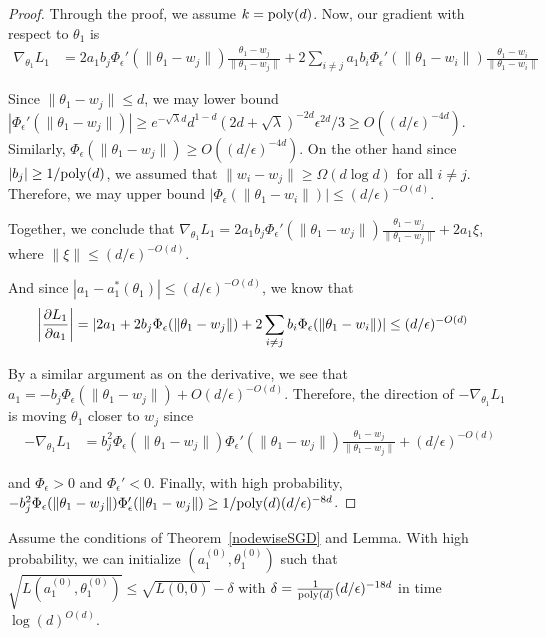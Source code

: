\begin{proof}
Through the proof, we assume $k = \mathrm{poly}(d)$. Now, our gradient with respect to $\theta_1$ is
%
\begin{align*}
\nabla_{\theta_1} L_1 &= 2a_1b_j \Phi_\epsilon'(\|\theta_1 - w_j\|) \frac{\theta_1 - w_j}{\|\theta_1 - w_j\|}+ 2\sum_{i\neq j} a_1b_i\Phi_\epsilon'(\|\theta_1 - w_i\|) \frac{\theta_1 - w_i}{\|\theta_1 - w_i\|}
\end{align*}
%

Since $\|\theta_1 - w_j\| \leq d$, we may lower bound $|\Phi_\epsilon'(\|\theta_1 - w_j\|)| \geq e^{-\sqrt{\lambda}d}d^{1-d}(2d+\sqrt{\lambda})^{-2d}\epsilon^{2d}/3 \geq O((d/\epsilon)^{-4d})$. Similarly, $\Phi_\epsilon(\|\theta_1 - w_j\|) \geq O((d/\epsilon)^{-4d})$. On the other hand since $|b_j| \geq 1/\mathrm{poly}(d)$, we assumed that $\|w_i - w_j\| \geq \Omega(d \log d)$ for all $i \neq j$. Therefore, we may upper bound $|\Phi_{\epsilon}(\|\theta_1 - w_i\|)| \leq (d/\epsilon)^{-O(d)}$. 

Together, we conclude that $\nabla_{\theta_1} L_1 = 2a_1b_j \Phi_\epsilon'(\|\theta_1 - w_j\|) \frac{\theta_1 - w_j}{\|\theta_1 - w_j\|} + 2a_1\xi$, where $\|\xi\| \leq (d/\epsilon)^{-O(d)}$.

And since $|a_1 - a_1^*(\theta_1)| \leq (d/\epsilon)^{-O(d)}$, we know that
%
\begin{align*}
   \left| \frac{\partial L_1}{\partial a_1} \right| & = \lvert 2a_1 + 2b_j \Phi_\epsilon(\|\theta_1 - w_j\|) + 2\sum_{i \neq j} b_i \Phi_\epsilon(\|\theta_1 - w_i\|) \rvert \leq (d/\epsilon)^{-O(d)}
\end{align*}

By a similar argument as on the derivative, we see that $a_1 = -b_j \Phi_\epsilon(\|\theta_1 - w_j\|) + O(d/\epsilon)^{-O(d)}$. Therefore, the direction of $-\nabla_{\theta_1} L_1$ is moving $\theta_1$ closer to $w_j$ since 
%
\begin{align*}
-\nabla_{\theta_1} L_1 &=  b_j^2\Phi_\epsilon(\|\theta_1-w_j\|)\Phi_\epsilon'(\|\theta_1 - w_j\|) \frac{\theta_1 - w_j}{\|\theta_1 - w_j\|} + (d/\epsilon)^{-O(d)} 
\end{align*}

and $\Phi_\epsilon > 0$ and $\Phi_\epsilon' < 0$. Finally, with high probability, $-b_j^2\Phi_\epsilon(\|\theta_1-w_j\|)\Phi_\epsilon'(\|\theta_1 - w_j\|) \geq 1/\mathrm{poly}(d)(d/\epsilon)^{-8d}$.
\end{proof}

 
 \begin{lemma}[Initialization]\label{nodeInitialize}
Assume the conditions of Theorem~\ref{nodewiseSGD} and Lemma. With high probability, we can initialize $(a_1^{(0)},\theta_1^{(0)})$ such that $\sqrt{L(a_1^{(0)},\theta_1^{(0)})} \leq \sqrt{L({0,0})} -\delta$ with $\delta = \frac{1}{\mathrm{poly}(d)}(d/\epsilon)^{ -18d}$ in time $\log(d)^{O(d)}$.
 \end{lemma}


